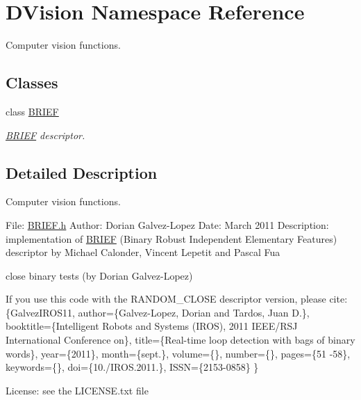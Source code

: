 \hypertarget{namespaceDVision}{}\section{D\+Vision Namespace Reference}
\label{namespaceDVision}


Computer vision functions.  


\subsection*{Classes}
\begin{DoxyCompactItemize}
\item 
class \hyperlink{classDVision_1_1BRIEF}{B\+R\+I\+EF}
\begin{DoxyCompactList}\small\item\em \hyperlink{classDVision_1_1BRIEF}{B\+R\+I\+EF} descriptor. \end{DoxyCompactList}\end{DoxyCompactItemize}


\subsection{Detailed Description}
Computer vision functions. 

File\+: \hyperlink{BRIEF_8h_source}{B\+R\+I\+E\+F.\+h} Author\+: Dorian Galvez-\/\+Lopez Date\+: March 2011 Description\+: implementation of \hyperlink{classDVision_1_1BRIEF}{B\+R\+I\+EF} (Binary Robust Independent Elementary Features) descriptor by Michael Calonder, Vincent Lepetit and Pascal Fua
\begin{DoxyItemize}
\item close binary tests (by Dorian Galvez-\/\+Lopez)
\end{DoxyItemize}

If you use this code with the R\+A\+N\+D\+O\+M\+\_\+\+C\+L\+O\+SE descriptor version, please cite\+: \{Galvez\+I\+R\+O\+S11, author=\{Galvez-\/\+Lopez, Dorian and Tardos, Juan D.\}, booktitle=\{Intelligent Robots and Systems (I\+R\+OS), 2011 I\+E\+E\+E/\+R\+SJ International Conference on\}, title=\{Real-\/time loop detection with bags of binary words\}, year=\{2011\}, month=\{sept.\}, volume=\{\}, number=\{\}, pages=\{51 -\/58\}, keywords=\{\}, doi=\{10./\+I\+R\+OS.2011.\}, I\+S\+SN=\{2153-\/0858\} \}

License\+: see the L\+I\+C\+E\+N\+S\+E.\+txt file 